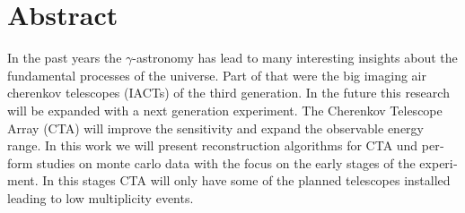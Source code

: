 \thispagestyle{plain}

\iffalse
\section*{Kurzfassung}
\begin{german}
In den letzten Jahrzehnten hat die $\gamma$-Astronomie 
viele Erkenntnisse über die Zusammensetzung des Universums gebracht.
Mitverantwortlich dafür waren die großen Image Air Cherenkov Telescope (IACT)
Experimente der dritten Generation.
In Zukunft soll diese Forschung begleitet und erweitert werden 
durch ein Experiment der nächsten Generation.
Das Cherenkov-Teleskope-Array (CTA) wird die Sensitiviät weiter steigern und den
beobachtbaren Energiebereich erweitern.
In dieser Arbeit werden Rekonstruktionsalgorithmen für CTA vorgestellt und Studien auf 
Monte-Carlo-Daten durchgeführt mit dem Fokus auf der frühen Phase des Experimentes.
Zu Beginn werden nur wenige Teleskope errichtet sein, sodass Ereignisse nur 
mit wenigen Teleskopen gesehen werden.
\end{german}
\fi

\section*{Abstract}
\begin{english}
In the past years the $\gamma$-astronomy has lead to many interesting
insights about the fundamental processes of the universe.
Part of that were the big imaging air cherenkov telescopes (IACTs) 
of the third generation.
In the future this research will be expanded with a next generation experiment.
The Cherenkov Telescope Array (CTA) will improve the sensitivity and
expand the observable energy range.
In this work we will present reconstruction algorithms for CTA und perform 
studies on monte carlo data with the focus on the early stages of the experiment.
In this stages CTA will only have some of the planned telescopes installed
leading to low multiplicity events.
\end{english}

